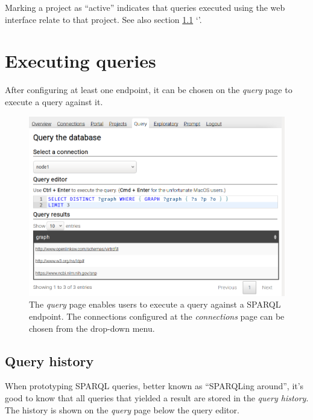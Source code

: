   Marking a project as ``active'' indicates that queries executed using the web
  interface relate to that project.  See also section \ref{sec:query-history}
  {\color{LinkGray}`'}.

\section{Executing queries}

  After configuring at least one endpoint, it can be chosen on the \emph{query}
  page to execute a query against it.

  \begin{figure}[H]
    \begin{center}
      \includegraphics[width=1.0\textwidth]{figures/web-query.png}
    \end{center}
    \caption{The \emph{query} page enables users to execute a query against a
      SPARQL endpoint.  The connections configured at the \emph{connections} page
      can be chosen from the drop-down menu.}
    \label{fig:web-query}
  \end{figure}

\subsection{Query history}
\label{sec:query-history}

  When prototyping SPARQL queries, better known as ``SPARQLing around'', it's
  good to know that all queries that yielded a result are stored in the
  \emph{query history}.  The history is shown on the \emph{query} page below the
  query editor.

